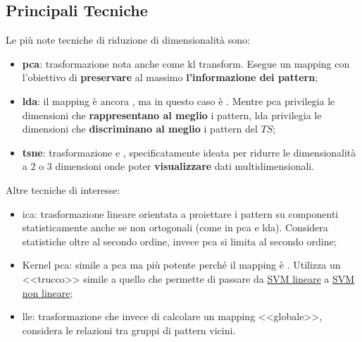\subsection{Principali Tecniche}\label{sub:dime_principali_tecniche} %
Le più note tecniche di riduzione di dimensionalità sono:
\begin{itemize}
    \item \textbf{\acf{pca}}: trasformazione  nota anche come \ac{kl} transform.
        Esegue un mapping  con l'obiettivo di \textbf{preservare} al massimo \textbf{l'informazione dei pattern};
    \item \textbf{\acf{lda}}: il mapping è ancora , ma in questo caso è .
        Mentre \ac{pca} privilegia le dimensioni che \textbf{rappresentano al meglio} i pattern, \ac{lda} privilegia le dimensioni che \textbf{discriminano al meglio} i pattern del $TS$;
    \item \textbf{\acf{tsne}}: trasformazione  e , specificatamente ideata per ridurre le dimensionalità a $2$ o $3$ dimensioni onde poter \textbf{visualizzare} dati multidimensionali.
\end{itemize}
Altre tecniche di interesse:
\begin{itemize}
    \item \acf{ica}: trasformazione lineare orientata a proiettare i pattern su componenti statisticamente  anche se non ortogonali (come in \ac{pca} e \ac{lda}).
        Considera statistiche oltre al secondo ordine, invece \ac{pca} si limita al secondo ordine;
    \item Kernel \ac{pca}: simile a \ac{pca} ma più potente perché il mapping è .
        Utilizza un <<trucco>> simile a quello che permette di passare da \hyperref[sub:svm_lineari]{SVM lineare} a \hyperref[sec:svm_non_lineari]{SVM non lineare};
    \item \ac{lle}: trasformazione  che invece di calcolare un mapping <<globale>>, considera le relazioni tra gruppi di pattern vicini.
\end{itemize}
%
